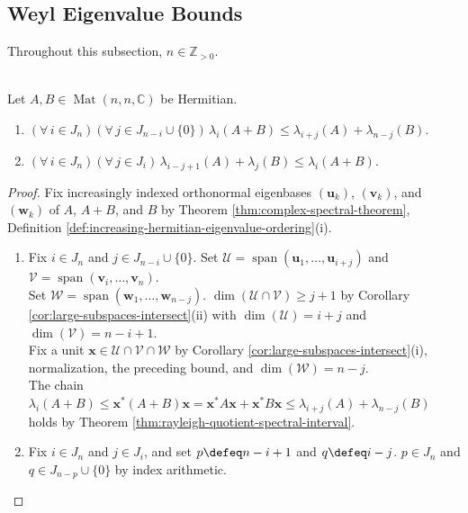 \subsection{Weyl Eigenvalue Bounds}

Throughout this subsection, $n\in\mathbb{Z}_{>0}$.

\begin{theorem} \label{thm:weyl-eigenvalue-inequalities-hermitian-sums} \\
Let $A,B\in\operatorname{Mat}(n,n,\mathbb{C})$ be Hermitian.
\begin{enumerate}[label=(\roman*)]
\setlength{\itemsep}{0pt}
\item $(\forall\,i\in J_n)(\forall\,j\in J_{n-i}\cup\{0\})\,\lambda_i(A+B)\leq\lambda_{i+j}(A)+\lambda_{n-j}(B)$.
\item $(\forall\,i\in J_n)(\forall\,j\in J_i)\,\lambda_{i-j+1}(A)+\lambda_j(B)\leq\lambda_i(A+B)$.
\end{enumerate}
\begin{proof}
Fix increasingly indexed orthonormal eigenbases $(\mathbf{u}_k)$, $(\mathbf{v}_k)$, and $(\mathbf{w}_k)$ of $A$, $A+B$, and $B$ by Theorem \ref{thm:complex-spectral-theorem}, Definition \ref{def:increasing-hermitian-eigenvalue-ordering}(i).
\begin{enumerate}[label=(\roman*)]
\setlength{\itemsep}{0pt}
\item Fix $i\in J_n$ and $j\in J_{n-i}\cup\{0\}$. Set $\mathcal{U}=\operatorname{span}(\mathbf{u}_1,\ldots,\mathbf{u}_{i+j})$ and $\mathcal{V}=\operatorname{span}(\mathbf{v}_i,\ldots,\mathbf{v}_n)$.\\
Set $\mathcal{W}=\operatorname{span}(\mathbf{w}_1,\ldots,\mathbf{w}_{n-j})$. $\dim(\mathcal{U}\cap\mathcal{V})\geq j+1$ by Corollary \ref{cor:large-subspaces-intersect}(ii) with $\dim(\mathcal{U})=i+j$ and $\dim(\mathcal{V})=n-i+1$.\\
Fix a unit $\mathbf{x}\in\mathcal{U}\cap\mathcal{V}\cap\mathcal{W}$ by Corollary \ref{cor:large-subspaces-intersect}(i), normalization, the preceding bound, and $\dim(\mathcal{W})=n-j$.\\
The chain $\lambda_i(A+B)\leq\mathbf{x}^*(A+B)\mathbf{x}=\mathbf{x}^*A\mathbf{x}+\mathbf{x}^*B\mathbf{x}\leq\lambda_{i+j}(A)+\lambda_{n-j}(B)$ holds by Theorem \ref{thm:rayleigh-quotient-spectral-interval}.
\item Fix $i\in J_n$ and $j\in J_i$, and set $p\defeq n-i+1$ and $q\defeq i-j$. $p\in J_n$ and $q\in J_{n-p}\cup\{0\}$ by index arithmetic.\\

\end{enumerate}
\end{proof}
\end{theorem}
